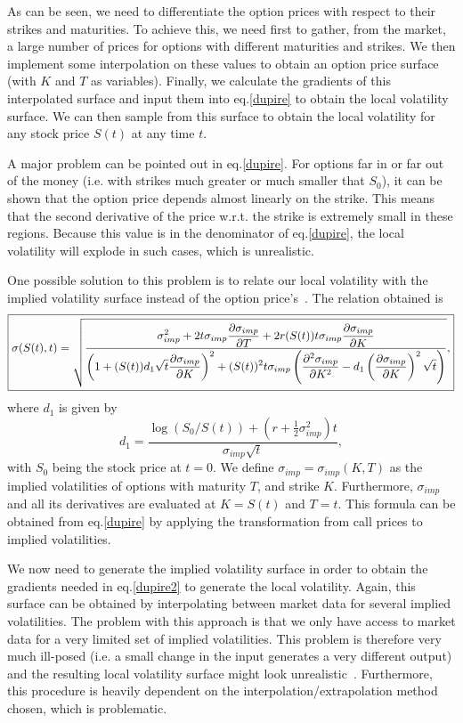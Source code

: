 As can be seen, we need to differentiate the option prices with respect to their strikes and maturities. To achieve this, we need first to gather, from the market, a large number of prices for options with different maturities and strikes. We then implement some interpolation on these values to obtain an option price surface (with $K$ and $T$ as variables). Finally, we calculate the gradients of this interpolated surface and input them into eq.\eqref{dupire} to obtain the local volatility surface.
We can then sample from this surface to obtain the local volatility for any stock price $S(t)$ at any time $t$.


A major problem can be pointed out in eq.\eqref{dupire}. For options far in or far out of the money (i.e. with strikes much greater or much smaller that $S_0$), it can be shown that the option price depends almost linearly on the strike. This means that the second derivative of the price w.r.t. the strike is extremely small in these regions. Because this value is in the denominator of eq.\eqref{dupire}, the local volatility will explode in such cases, which is unrealistic.


One possible solution to this problem is to relate our local volatility with the implied volatility surface instead of the option price's~\citep{Wilmott}.
The relation obtained is
\begin{equation}\label{dupire2}
\boxed{\sigma(S(t),t)=\sqrt{\frac{\displaystyle\sigma_{imp}^2+2t\sigma_{imp}\pdv{\sigma_{imp}}{T}+2r(S(t))t\sigma_{imp}\pdv{\sigma_{imp}}{K}}{\displaystyle\left(1+(S(t))d_1\sqrt{t}\pdv{\sigma_{imp}}{K}\right)^2+(S(t))^2t\sigma_{imp}\left(\pdv{^2\sigma_{imp}}{K^2}-d_1\left(\pdv{\sigma_{imp}}{K}\right)^2\sqrt{t}\right)}},}
\end{equation}
\noindent where $d_1$ is given by
\begin{equation}
d_1=\frac{\log(S_0/S(t))+\left(r+\frac{1}{2}\sigma_{imp}^2\right)t}{\sigma_{imp}\sqrt{t}},
\end{equation}
\noindent with $S_0$ being the stock price at $t=0$. We define $\sigma_{imp}=\sigma_{imp}(K,T)$ as the implied volatilities of options with maturity $T$, and strike $K$. Furthermore, $\sigma_{imp}$ and all its derivatives are evaluated at $K=S(t)$ and $T=t$. This formula can be obtained from eq.\eqref{dupire} by applying the transformation from call prices to implied volatilities.


We now need to generate the implied volatility surface in order to obtain the gradients needed in eq.\eqref{dupire2} to generate the local volatility. Again, this surface can be obtained by interpolating between market data for several implied volatilities. The problem with this approach is that we only have access to market data for a very limited set of implied volatilities. This problem is therefore very much ill-posed (i.e. a small change in the input generates a very different output) and the resulting local volatility surface might look unrealistic~\citep{Wilmott}. Furthermore, this procedure is heavily dependent on the interpolation/extrapolation method chosen, which is problematic.

